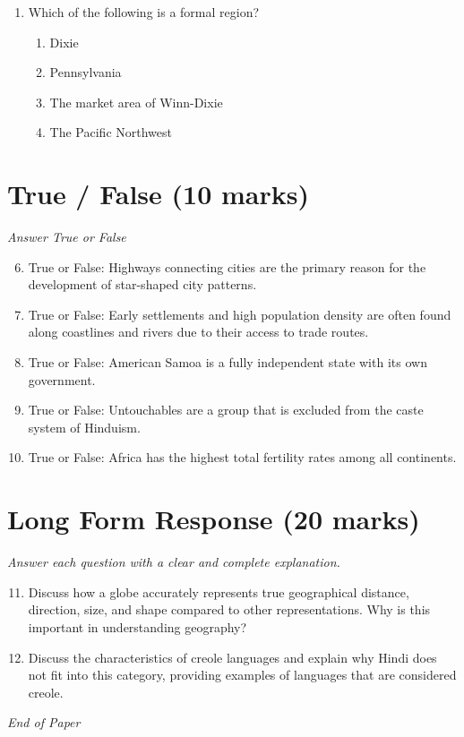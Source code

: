 \documentclass[12pt]{article}
\begin{document}
\begin{enumerate}[label=\arabic*.]
\begin{enumerate}[label=(\alph*)]
    \item Improved automobiles made transportation easier and less limited.
\end{enumerate}
\item Which of the following is a formal region?
\begin{enumerate}[label=(\alph*)]
    \item Dixie
    \item Pennsylvania
    \item The market area of Winn-Dixie
    \item The Pacific Northwest
\end{enumerate}
\end{enumerate}

\section*{True / False (10 marks)}
\textit{Answer True or False}
\begin{enumerate}[label=\arabic*.]
\setcounter{enumi}{5}
\item True or False: Highways connecting cities are the primary reason for the development of star-shaped city patterns.
\item True or False: Early settlements and high population density are often found along coastlines and rivers due to their access to trade routes.
\item True or False: American Samoa is a fully independent state with its own government.
\item True or False: Untouchables are a group that is excluded from the caste system of Hinduism.
\item True or False: Africa has the highest total fertility rates among all continents.
\end{enumerate}

\section*{Long Form Response (20 marks)}
\textit{Answer each question with a clear and complete explanation.}
\begin{enumerate}[label=\arabic*.]
\setcounter{enumi}{10}
\item Discuss how a globe accurately represents true geographical distance, direction, size, and shape compared to other representations. Why is this important in understanding geography?
\item Discuss the characteristics of creole languages and explain why Hindi does not fit into this category, providing examples of languages that are considered creole.
\end{enumerate}

\vfill
\noindent\textit{End of Paper}
\end{document}
